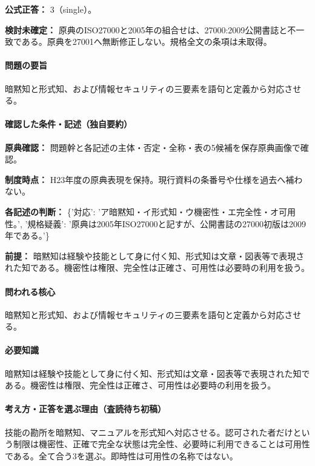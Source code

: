 \textbf{公式正答：} 3（single）。

\par\textbf{検討未確定：} 原典のISO27000と2005年の組合せは、27000:2009公開書誌と不一致である。原典を27001へ無断修正しない。規格全文の条項は未取得。

\paragraph{問題の要旨} 暗黙知と形式知、および情報セキュリティの三要素を語句と定義から対応させる。

\paragraph{確認した条件・記述（独自要約）}\mbox{}\par

\noindent\textbf{原典確認：} 問題幹と各記述の主体・否定・全称・表の5候補を保存原典画像で確認。\par

\noindent\textbf{制度時点：} H23年度の原典表現を保持。現行資料の条番号や仕様を過去へ補わない。\par

\noindent\textbf{各記述の判断：} \{'対応': 'ア暗黙知・イ形式知・ウ機密性・エ完全性・オ可用性。', '規格疑義': '原典は2005年ISO27000と記すが、公開書誌の27000初版は2009年である。'\}\par

\noindent\textbf{前提：} 暗黙知は経験や技能として身に付く知、形式知は文章・図表等で表現された知である。機密性は権限、完全性は正確さ、可用性は必要時の利用を扱う。\par

\paragraph{問われる核心} 暗黙知と形式知、および情報セキュリティの三要素を語句と定義から対応させる。

\paragraph{必要知識} 暗黙知は経験や技能として身に付く知、形式知は文章・図表等で表現された知である。機密性は権限、完全性は正確さ、可用性は必要時の利用を扱う。

\paragraph{考え方・正答を選ぶ理由（査読待ち初稿）} 技能の勘所を暗黙知、マニュアルを形式知へ対応させる。認可された者だけという制限は機密性、正確で完全な状態は完全性、必要時に利用できることは可用性である。全て合う3を選ぶ。即時性は可用性の名称ではない。

